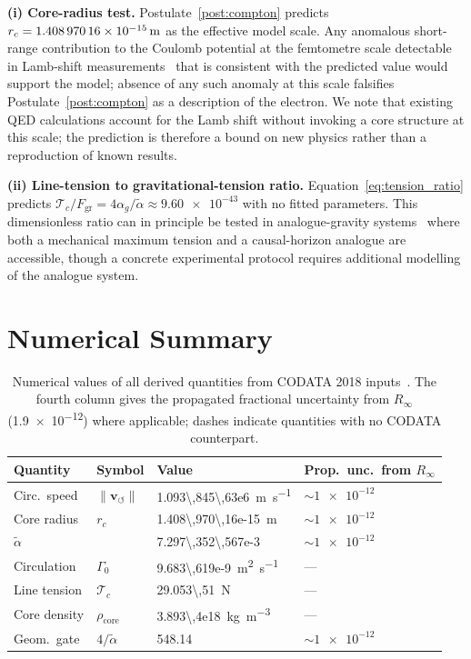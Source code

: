 \documentclass[aps,pra,preprint,longbibliography,nofootinbib]{revtex4-2}
\newcommand{\vnorm}{\lVert\mathbf{v}_{\!\boldsymbol{\circlearrowleft}}\rVert} %
\newcommand{\rhocore}{\rho_{\mathrm{core}}}      %
\newcommand{\rc}{r_c}                            %
\newcommand{\Rinf}{R_\infty}                     %
\newcommand{\Tc}{\mathcal{T}_c}                  %
\newcommand{\Fgr}{F_{\mathrm{gr}}}              %
\newcommand{\Gz}{\Gamma_0}                       %
\begin{document}
\medskip
\noindent\textbf{(i) Core-radius test.}
Postulate~\ref{post:compton} predicts $\rc = \SI{1.408\,970\,16e-15}{\meter}$
as the effective model scale.
Any anomalous short-range contribution to the Coulomb potential at
the femtometre scale detectable in Lamb-shift
measurements~\cite{Bethe1947,Karshenboim2005} that is consistent
with the predicted value would support the model;
absence of any such anomaly at this scale falsifies
Postulate~\ref{post:compton} as a description of the electron.
We note that existing QED calculations account for the Lamb shift
without invoking a core structure at this scale; the prediction
is therefore a bound on new physics rather than a reproduction of
known results.

\medskip
\noindent\textbf{(ii) Line-tension to gravitational-tension ratio.}
Equation~\eqref{eq:tension_ratio} predicts
$\Tc/\Fgr = 4\alpha_g/\tilde\alpha \approx \num{9.60e-43}$
with no fitted parameters.
This dimensionless ratio can in principle be tested in
analogue-gravity systems~\cite{Barcelo2005} where both a mechanical
maximum tension and a causal-horizon analogue are accessible,
though a concrete experimental protocol requires additional modelling
of the analogue system.

\section{Numerical Summary}
\label{sec:numerical}

\begin{table}[h]
\centering
\caption{Numerical values of all derived quantities from CODATA 2018
inputs~\cite{MohrTaylor2018}.
The fourth column gives the propagated fractional uncertainty from $\Rinf$
(\num{1.9e-12}) where applicable; dashes indicate quantities with no
CODATA counterpart.}
\label{tab:numbers}
\begin{tabular}{llll}
\toprule
Quantity & Symbol & Value & Prop.\ unc.\ from $\Rinf$ \\
\midrule
Circ.\ speed   & $\vnorm$ & \SI{1.093\,845\,63e6}{\m\per\s}      & $\sim\num{1e-12}$ \\
Core radius    & $\rc$    & \SI{1.408\,970\,16e-15}{\meter}       & $\sim\num{1e-12}$ \\
$\tilde\alpha$ &          & \num{7.297\,352\,567e-3}              & $\sim\num{1e-12}$ \\
Circulation    & $\Gz$    & \SI{9.683\,619e-9}{\m\squared\per\s}  & — \\
Line tension   & $\Tc$    & \SI{29.053\,51}{\newton}               & — \\
Core density   & $\rhocore$& \SI{3.893\,4e18}{\kg\per\m\cubed}    & — \\
Geom.\ gate    & $4/\tilde\alpha$ & \num{548.14}               & $\sim\num{1e-12}$ \\
\bottomrule
\end{tabular}
\end{table}
\end{document}
